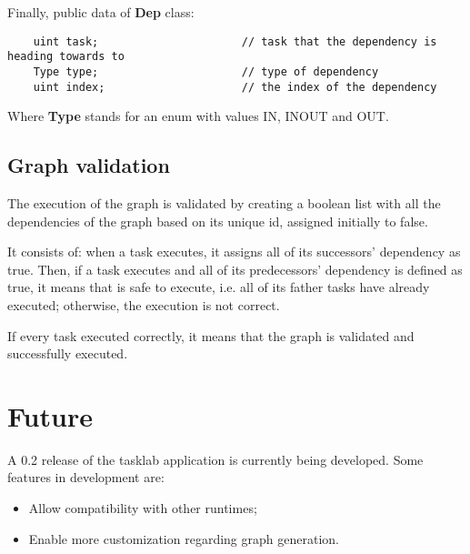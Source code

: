 \documentclass[a4paper,10pt]{article}
\begin{document}
       Finally, public data of \textbf{Dep} class:

       \begin{lstlisting}
    uint task;                      // task that the dependency is heading towards to
    Type type;                      // type of dependency
    uint index;                     // the index of the dependency
       \end{lstlisting}       

       Where \textbf{Type} stands for an enum with values IN, INOUT and OUT.

    \subsection{Graph validation}
        The execution of the graph is validated by creating a boolean list with all the dependencies of the graph based on its unique id, assigned initially to false. 

        It consists of: when a task executes, it assigns all of its successors' dependency as true. Then, if a task executes and all of its predecessors' dependency is defined as true, it means that is safe to execute, i.e. all of its father tasks have already executed; otherwise, the execution is not correct.

        If every task executed correctly, it means that the graph is validated and successfully executed.

\section{Future}
    A 0.2 release of the tasklab application is currently being developed. Some features in development are:

    \begin{itemize}
        \item Allow compatibility with other runtimes;
        \item Enable more customization regarding graph generation.
    \end{itemize}
\end{document}
